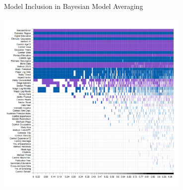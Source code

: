 \documentclass{beamer} %
\begin{document}
\begin{frame}{Model Inclusion in Bayesian Model Averaging}
    \begin{center}
        \includegraphics[width=0.7\textwidth]{Figures/bma_UIP_dilut_results.png}
    \end{center}
\end{frame}
\end{document}
